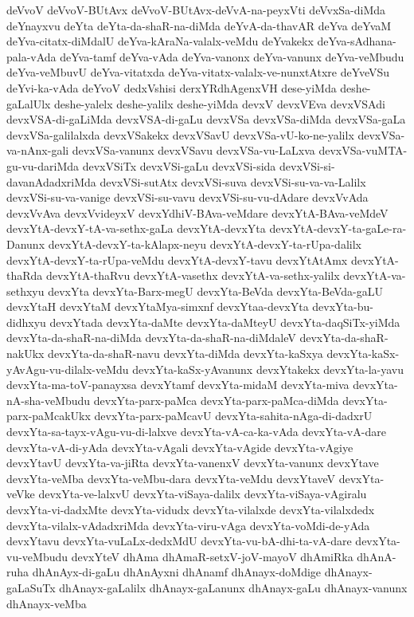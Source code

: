 {deVvoV
deVvoV-BUtAvx
deVvoV-BUtAvx-deVvA-na-peyxVti
deVvxSa-diMda
deYnayxvu
deYta
deYta-da-shaR-na-diMda
deYvA-da-thavAR
deYva
deYvaM
deYva-citatx-diMdalU
deYva-kAraNa-valalx-veMdu
deYvakekx
deYva-sAdhana-pala-vAda
deYva-tamf
deYva-vAda
deYva-vanonx
deYva-vanunx
deYva-veMbudu
deYva-veMbuvU
deYva-vitatxda
deYva-vitatx-valalx-ve-nunxtAtxre
deYveVSu
deYvi-ka-vAda
deYvoV
dedxVshisi
derxYRdhAgenxVH
dese-yiMda
deshe-gaLalUlx
deshe-yalelx
deshe-yalilx
deshe-yiMda
devxV
devxVEva
devxVSAdi
devxVSA-di-gaLiMda
devxVSA-di-gaLu
devxVSa
devxVSa-diMda
devxVSa-gaLa
devxVSa-galilalxda
devxVSakekx
devxVSavU
devxVSa-vU-ko-ne-yalilx
devxVSa-va-nAnx-gali
devxVSa-vanunx
devxVSavu
devxVSa-vu-LaLxva
devxVSa-vuMTA-gu-vu-dariMda
devxVSiTx
devxVSi-gaLu
devxVSi-sida
devxVSi-si-davanAdadxriMda
devxVSi-sutAtx
devxVSi-suva
devxVSi-su-va-va-Lalilx
devxVSi-su-va-vanige
devxVSi-su-vavu
devxVSi-su-vu-dAdare
devxVvAda
devxVvAva
devxVvideyxV
devxYdhiV-BAva-veMdare
devxYtA-BAva-veMdeV
devxYtA-devxY-tA-va-sethx-gaLa
devxYtA-devxYta
devxYtA-devxY-ta-gaLe-ra-Danunx
devxYtA-devxY-ta-kAlapx-neyu
devxYtA-devxY-ta-rUpa-dalilx
devxYtA-devxY-ta-rUpa-veMdu
devxYtA-devxY-tavu
devxYtAtAmx
devxYtA-thaRda
devxYtA-thaRvu
devxYtA-vasethx
devxYtA-va-sethx-yalilx
devxYtA-va-sethxyu
devxYta
devxYta-Barx-megU
devxYta-BeVda
devxYta-BeVda-gaLU
devxYtaH
devxYtaM
devxYtaMya-simxnf
devxYtaa-devxYta
devxYta-bu-didhxyu
devxYtada
devxYta-daMte
devxYta-daMteyU
devxYta-daqSiTx-yiMda
devxYta-da-shaR-na-diMda
devxYta-da-shaR-na-diMdaleV
devxYta-da-shaR-nakUkx
devxYta-da-shaR-navu
devxYta-diMda
devxYta-kaSxya
devxYta-kaSx-yAvAgu-vu-dilalx-veMdu
devxYta-kaSx-yAvanunx
devxYtakekx
devxYta-la-yavu
devxYta-ma-toV-panayxsa
devxYtamf
devxYta-midaM
devxYta-miva
devxYta-nA-sha-veMbudu
devxYta-parx-paMca
devxYta-parx-paMca-diMda
devxYta-parx-paMcakUkx
devxYta-parx-paMcavU
devxYta-sahita-nAga-di-dadxrU
devxYta-sa-tayx-vAgu-vu-di-lalxve
devxYta-vA-ca-ka-vAda
devxYta-vA-dare
devxYta-vA-di-yAda
devxYta-vAgali
devxYta-vAgide
devxYta-vAgiye
devxYtavU
devxYta-va-jiRta
devxYta-vanenxV
devxYta-vanunx
devxYtave
devxYta-veMba
devxYta-veMbu-dara
devxYta-veMdu
devxYtaveV
devxYta-veVke
devxYta-ve-lalxvU
devxYta-viSaya-dalilx
devxYta-viSaya-vAgiralu
devxYta-vi-dadxMte
devxYta-vidudx
devxYta-vilalxde
devxYta-vilalxdedx
devxYta-vilalx-vAdadxriMda
devxYta-viru-vAga
devxYta-voMdi-de-yAda
devxYtavu
devxYta-vuLaLx-dedxMdU
devxYta-vu-bA-dhi-ta-vA-dare
devxYta-vu-veMbudu
devxYteV
dhAma
dhAmaR-setxV-joV-mayoV
dhAmiRka
dhAnA-ruha
dhAnAyx-di-gaLu
dhAnAyxni
dhAnamf
dhAnayx-doMdige
dhAnayx-gaLaSuTx
dhAnayx-gaLalilx
dhAnayx-gaLanunx
dhAnayx-gaLu
dhAnayx-vanunx
dhAnayx-veMba
}

